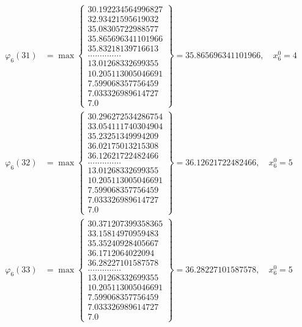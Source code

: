 \documentclass{article}
\begin{document}
\begin{align*}
  
  
  
\varphi_{6}(31) &= \max \left\{ \begin{array}{c}
30.192234564996827 \\
 32.93421595619032 \\
 35.08305722988577 \\
 35.865696341101966 \\
 35.83218139716613 \\
 .............. \\
 13.01268332699355 \\
 10.205113005046691 \\
 7.599068357756459 \\
 7.033326989614727 \\
 7.0
\end{array} \right\} = 35.865696341101966, \quad x_{6}^0 = 4\\
  
  
  
  
\varphi_{6}(32) &= \max \left\{ \begin{array}{c}
30.296272534286754 \\
 33.054111740304904 \\
 35.23251349994209 \\
 36.02175013215308 \\
 36.12621722482466 \\
 .............. \\
 13.01268332699355 \\
 10.205113005046691 \\
 7.599068357756459 \\
 7.033326989614727 \\
 7.0
\end{array} \right\} = 36.12621722482466, \quad x_{6}^0 = 5\\
  
  
  
  
\varphi_{6}(33) &= \max \left\{ \begin{array}{c}
30.371207399358365 \\
 33.15814970959483 \\
 35.35240928405667 \\
 36.1712064022094 \\
 36.28227101587578 \\
 .............. \\
 13.01268332699355 \\
 10.205113005046691 \\
 7.599068357756459 \\
 7.033326989614727 \\
 7.0
\end{array} \right\} = 36.28227101587578, \quad x_{6}^0 = 5\\
  

\end{align*}
\end{document}
